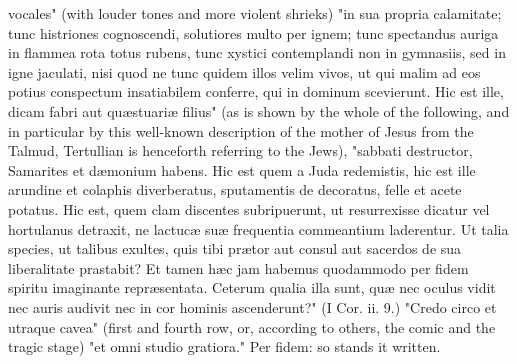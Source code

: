 \documentclass[12pt]{article}
\begin{document}
vocales" (with louder tones and more violent shrieks) "in sua propria calamitate; tunc histriones cognoscendi, solutiores multo per ignem; tunc spectandus auriga in flammea rota totus rubens, tunc xystici contemplandi non in gymnasiis, sed in igne jaculati, nisi quod ne tunc quidem illos velim vivos, ut qui malim ad eos potius conspectum insatiabilem conferre, qui in dominum scevierunt. Hic est ille, dicam fabri aut quæstuariæ filius" (as is shown by the whole of the following, and in particular by this well-known description of the mother of Jesus from the Talmud, Tertullian is henceforth referring to the Jews), "sabbati destructor, Samarites et dæmonium habens. Hic est quem a Juda redemistis, hic est ille arundine et colaphis diverberatus, sputamentis de decoratus, felle et acete potatus. Hic est, quem clam discentes subripuerunt, ut resurrexisse dicatur vel hortulanus detraxit, ne lactucæ suæ frequentia commeantium laderentur. Ut talia species, ut talibus exultes, quis tibi prætor aut consul aut sacerdos de sua liberalitate prastabit? Et tamen hæc jam habemus quodammodo per fidem spiritu imaginante repræsentata. Ceterum qualia illa sunt, quæ nec oculus vidit nec auris audivit nec in cor hominis ascenderunt?" (I Cor. ii. 9.) "Credo circo et utraque cavea" (first and fourth row, or, according to others, the comic and the tragic stage) "et omni studio gratiora." Per fidem: so stands it written.
\end{document}
